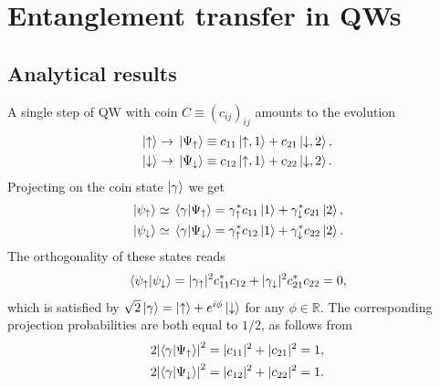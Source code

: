 \documentclass[
	aps, pra,
	superscriptaddress, twocolumn,
	floatfix,
	10pt
]{revtex4-1}
\newcommand{\parTitle}[1]{\noindent{\color{Mahogany}(\emph{#1})}}
\newcommand{\RR}{\mathbb{R}}
\newcommand{\calW}{{\mathcal{W}}}
\begin{document}
\section{Entanglement transfer in QWs}
\label{sec:entanglement_transfer_in_QWs}

\subsection{Analytical results}
\parTitle{Single step}
A single step of QW with coin $C\equiv (c_{ij})_{ij}$ amounts to the evolution
\begin{equation}
\begin{aligned}
	\ket\uparrow&\rightarrow \ket*{\Psi_\uparrow} \equiv c_{11}\ket{\uparrow,1} + c_{21}\ket{\downarrow,2}, \\
	\ket\downarrow&\rightarrow \ket*{\Psi_\downarrow} \equiv c_{12}\ket{\uparrow,1} + c_{22}\ket{\downarrow,2}.
\end{aligned}
\end{equation}
Projecting on the coin state $\ket\gamma$ we get
\begin{equation}
\begin{aligned}
	\ket*{\psi_\uparrow} \simeq \braket*{\gamma}{\Psi_\uparrow} &= \gamma_\uparrow^*c_{11}\ket1 + \gamma_\downarrow^* c_{21}\ket2, \\
	\ket*{\psi_\downarrow} \simeq \braket*{\gamma}{\Psi_\downarrow} &= \gamma_\uparrow^* c_{12} \ket1 + \gamma_\downarrow^* c_{22} \ket2.
\end{aligned}
\end{equation}
The orthogonality of these states reads
\begin{equation}
\begin{gathered}
	\braket*{\psi_\uparrow}{\psi_\downarrow}
	= |\gamma_\uparrow|^2 c_{11}^* c_{12} + |\gamma_\downarrow|^2 c_{21}^* c_{22} = 0,
\end{gathered}
\end{equation}
which is satisfied by $\sqrt2\ket\gamma = \ket\uparrow + e^{i\phi}\ket\downarrow$ for any $\phi\in\RR$.
The corresponding projection probabilities are both equal to $1/2$, as follows from
\begin{equation}
\begin{aligned}
	2\abs{\braket{\gamma}{\Psi_\uparrow}}^2 &= |c_{11}|^2 + |c_{21}|^2 = 1, \\
	2\abs{\braket{\gamma}{\Psi_\downarrow}}^2 &= |c_{12}|^2 + |c_{22}|^2 = 1.
\end{aligned}
\end{equation}
\end{document}
